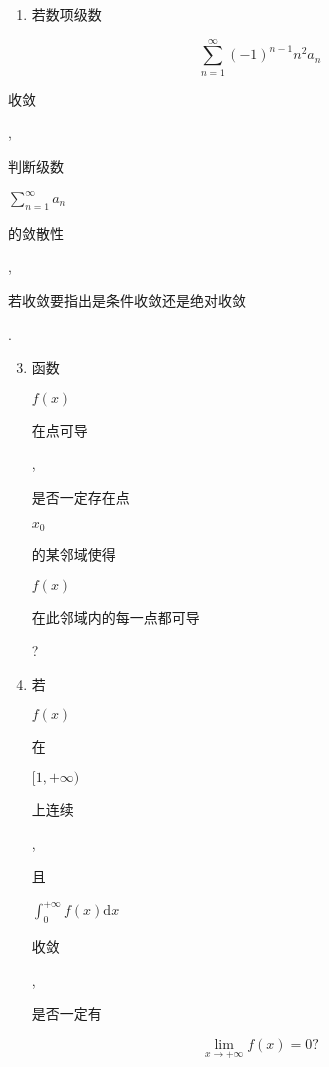 \documentclass[10pt]{article}
\begin{document}
\begin{enumerate}
  \item \begin{CJK}{UTF8}{mj}若数项级数\end{CJK}
\end{enumerate}
$$
\sum_{n=1}^{\infty}(-1)^{n-1} n^{2} a_{n}
$$
\begin{CJK}{UTF8}{mj}收敛\end{CJK}, \begin{CJK}{UTF8}{mj}判断级数\end{CJK} $\sum_{n=1}^{\infty} a_{n}$ \begin{CJK}{UTF8}{mj}的敛散性\end{CJK}, \begin{CJK}{UTF8}{mj}若收敛要指出是条件收敛还是绝对收敛\end{CJK}.

\begin{enumerate}
  \setcounter{enumi}{2}
  \item \begin{CJK}{UTF8}{mj}函数\end{CJK} $f(x)$ \begin{CJK}{UTF8}{mj}在点可导\end{CJK}, \begin{CJK}{UTF8}{mj}是否一定存在点\end{CJK} $x_{0}$ \begin{CJK}{UTF8}{mj}的某邻域使得\end{CJK} $f(x)$ \begin{CJK}{UTF8}{mj}在此邻域内的每一点都可导\end{CJK}?

  \item \begin{CJK}{UTF8}{mj}若\end{CJK} $f(x)$ \begin{CJK}{UTF8}{mj}在\end{CJK} $[1,+\infty)$ \begin{CJK}{UTF8}{mj}上连续\end{CJK}, \begin{CJK}{UTF8}{mj}且\end{CJK} $\int_{0}^{+\infty} f(x) \mathrm{d} x$ \begin{CJK}{UTF8}{mj}收敛\end{CJK}, \begin{CJK}{UTF8}{mj}是否一定有\end{CJK}

\end{enumerate}
$$
\lim _{x \rightarrow+\infty} f(x)=0 ?
$$
\end{document}
